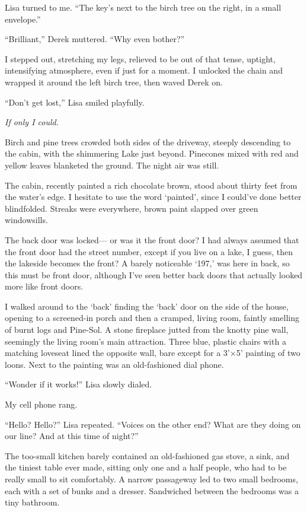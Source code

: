 Lisa turned to me. ``The key's next to the birch tree on the right, in a
small envelope.''

``Brilliant,'' Derek muttered. ``Why even bother?''

I stepped out, stretching my legs, relieved to be out of that tense,
uptight, intensifying atmosphere, even if just for a moment. I unlocked
the chain and wrapped it around the left birch tree, then waved Derek
on.

``Don't get lost,'' Lisa smiled playfully.

\emph{If only I could.}

Birch and pine trees crowded both sides of the driveway, steeply
descending to the cabin, with the shimmering Lake just beyond. Pinecones
mixed with red and yellow leaves blanketed the ground. The night air was
still.

The cabin, recently painted a rich chocolate brown, stood about thirty
feet from the water's edge. I hesitate to use the word `painted', since
I could've done better blindfolded. Streaks were everywhere, brown paint
slapped over green windowsills.

The back door was locked--- or was it the front door? I had always
assumed that the front door had the street number, except if you live on
a lake, I guess, then the lakeside becomes the front? A barely
noticeable `197,' was here in back, so this must be front door, although
I've seen better back doors that actually looked more like front doors.

I walked around to the `back' finding the `back' door on the side of the
house, opening to a screened-in porch and then a cramped, living room,
faintly smelling of burnt logs and Pine-Sol. A stone fireplace jutted
from the knotty pine wall, seemingly the living room's main attraction.
Three blue, plastic chairs with a matching loveseat lined the opposite
wall, bare except for a 3'×5' painting of two loons. Next to the
painting was an old-fashioned dial phone.

``Wonder if it works!'' Lisa slowly dialed.

My cell phone rang.

``Hello? Hello?'' Lisa repeated. ``Voices on the other end? What are
they doing on our line? And at this time of night?''

The too-small kitchen barely contained an old-fashioned gas stove, a
sink, and the tiniest table ever made, sitting only one and a half
people, who had to be really small to sit comfortably. A narrow
passageway led to two small bedrooms, each with a set of bunks and a
dresser. Sandwiched between the bedrooms was a tiny bathroom.

